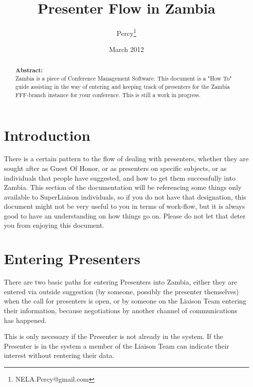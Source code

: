 \documentclass[captions=tablesignature]{scrartcl}
\author{Percy\thanks{NELA.Percy@gmail.com}}
\date{March 2012}
\title{Presenter Flow in Zambia}
\begin{document}
\maketitle
{}
\thispagestyle{fancy}
\renewcommand{\headrulewidth}{0pt}
\renewcommand{\footrulewidth}{0pt}
\lhead{}
\rhead{}
\chead{}
\lfoot{}
\cfoot{}
\rfoot{}
\begin{abstract}
\vspace{5cm}
{\LARGE{\textbf{Abstract:\\}}}
Zambia is a piece of Conference Management Software.  This document is a "How To" guide assisting in the way of entering and keeping track of presenters for the Zambia FFF-branch instance for your conference.  This is still a work in progress.
\end{abstract}
\newpage
\renewcommand{\headrulewidth}{1pt}
\renewcommand{\footrulewidth}{1pt}
\rfoot{\thepage}
\setcounter{tocdepth}{3}
\tableofcontents
\listoffigures
\listoftables
\newpage
{}
\section{Introduction}
\label{sec-1}

There is a certain pattern to the flow of dealing with presenters,
whether they are sought after as Guest Of Honor, or as presenters on
specific subjects, or as individuals that people have suggested, and
how to get them successfully into Zambia.  This section of the
documentation will be referencing some things only available to
SuperLiaison individuals, so if you do not have that designation,
this document might not be very useful to you in terms of work-flow,
but it is always good to have an understanding on how things go on.
Please do not let that deter you from enjoying this document.
\section{Entering Presenters}
\label{sec-2}
There are two basic paths for entering Presenters into Zambia,
either they are entered via outside suggestion (by someone, possibly
the presenter themselves) when the call for presenters is open, or
by someone on the Liaison Team entering their information, because
negotiations by another channel of communications has happened.

This is only necessary if the Presenter is not already in the
system.  If the Presenter is in the system a member of the Liaison
Team can indicate their interest without rentering their data.
\end{document}
